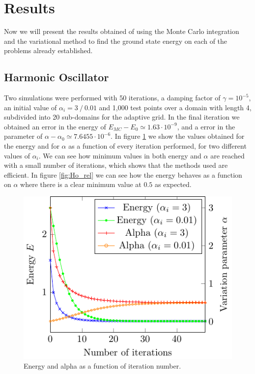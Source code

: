 
\section{Results}
Now we will present the results obtained of using the Monte Carlo integration and the variational
method to find the ground state energy on each of the problems already established.

\subsection{Harmonic Oscillator}
Two simulations were performed with 50 iterations, a damping factor of $\gamma = 10^{-5}$,
an initial value of $\alpha_i = 3~/~ 0.01$  and 1,000 test points over a domain with length 4,
subdivided into 20 sub-domains for the adaptive grid. In the final iteration we obtained an
error in the energy of $E_{MC}-E_0 \simeq 1.63\cdot 10^{-9}$,
and a error in the parameter of $\alpha - \alpha_0 \simeq 7.6455\cdot 10^{-6}$. In figure \ref{fig:Ho_it}
we show the values obtained for the energy and for $\alpha$ as a function of every iteration performed,
for two different values of $\alpha_i$. We can see how  minimum values in both energy and $\alpha$ are
reached with a small number of iterations, which shows that the methods used are efficient. In figure
 \ref{fig:Ho_rel} we can see how the energy behaves as a function on $\alpha$ where there is a clear
minimum value at $0.5$ as expected.
\begin{figure}
	\begin{center}
		\includegraphics[scale=0.9]{graphs/ho-e-alpha-iterations.pdf}
		\caption{
			Energy and alpha as a function of iteration number. %
			}
		\label{fig:Ho_it}
	\end{center}
\end{figure}
